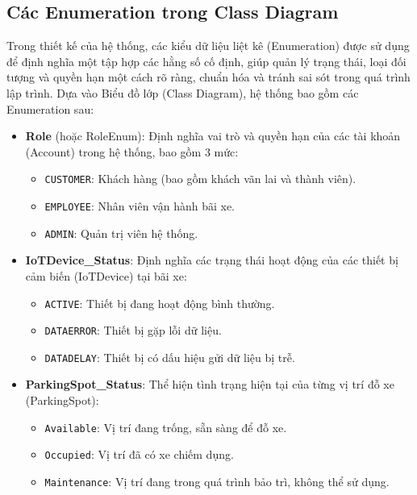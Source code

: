 \subsection{Các Enumeration trong Class Diagram}

Trong thiết kế của hệ thống, các kiểu dữ liệu liệt kê (Enumeration) được sử dụng để định nghĩa một tập hợp các hằng số cố định, giúp quản lý trạng thái, loại đối tượng và quyền hạn một cách rõ ràng, chuẩn hóa và tránh sai sót trong quá trình lập trình. Dựa vào Biểu đồ lớp (Class Diagram), hệ thống bao gồm các Enumeration sau:

\begin{itemize}
    \item \textbf{Role} (hoặc RoleEnum): Định nghĩa vai trò và quyền hạn của các tài khoản (Account) trong hệ thống, bao gồm 3 mức:
    \begin{itemize}
        \item \texttt{CUSTOMER}: Khách hàng (bao gồm khách vãn lai và thành viên).
        \item \texttt{EMPLOYEE}: Nhân viên vận hành bãi xe.
        \item \texttt{ADMIN}: Quản trị viên hệ thống.
    \end{itemize}

    \item \textbf{IoTDevice\_Status}: Định nghĩa các trạng thái hoạt động của các thiết bị cảm biến (IoTDevice) tại bãi xe:
    \begin{itemize}
        \item \texttt{ACTIVE}: Thiết bị đang hoạt động bình thường.
        \item \texttt{DATAERROR}: Thiết bị gặp lỗi dữ liệu.
        \item \texttt{DATADELAY}: Thiết bị có dấu hiệu gửi dữ liệu bị trễ.
    \end{itemize}

    \item \textbf{ParkingSpot\_Status}: Thể hiện tình trạng hiện tại của từng vị trí đỗ xe (ParkingSpot):
    \begin{itemize}
        \item \texttt{Available}: Vị trí đang trống, sẵn sàng để đỗ xe.
        \item \texttt{Occupied}: Vị trí đã có xe chiếm dụng.
        \item \texttt{Maintenance}: Vị trí đang trong quá trình bảo trì, không thể sử dụng.
    \end{itemize}


\end{itemize}
